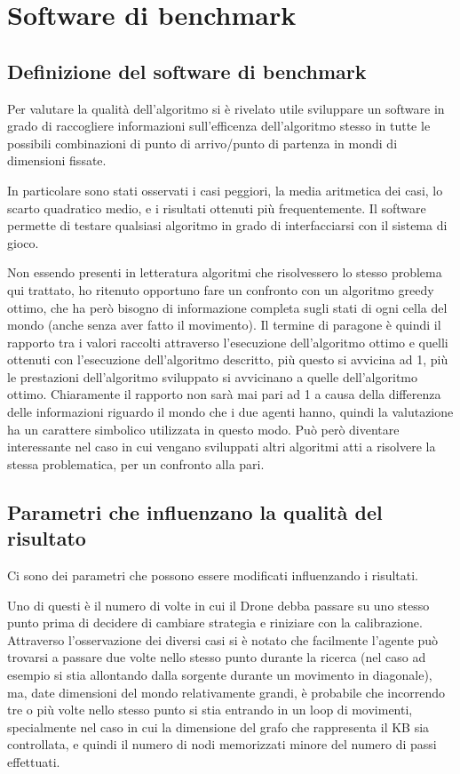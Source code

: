 \chapter{Software di benchmark}
\section{Definizione del software di benchmark}
Per valutare la qualità dell'algoritmo si è rivelato utile sviluppare un software in grado di raccogliere informazioni sull'efficenza dell'algoritmo stesso in tutte le possibili combinazioni di punto di arrivo/punto di partenza in mondi di dimensioni fissate. 

In particolare sono stati osservati i casi peggiori, la media aritmetica dei casi, lo scarto quadratico medio, e i risultati ottenuti più frequentemente. Il software permette di testare qualsiasi algoritmo in grado di interfacciarsi con il sistema di gioco. 

Non essendo presenti in letteratura algoritmi che risolvessero lo stesso problema qui trattato, ho ritenuto opportuno fare un confronto con un algoritmo greedy ottimo, che ha però bisogno di informazione completa sugli stati di ogni cella del mondo (anche senza aver fatto il movimento). Il termine di paragone è quindi il rapporto tra i valori raccolti attraverso l'esecuzione dell'algoritmo ottimo e quelli ottenuti con l'esecuzione dell'algoritmo descritto, più questo si avvicina ad 1, più le prestazioni dell'algoritmo sviluppato si avvicinano a quelle dell'algoritmo ottimo. Chiaramente il rapporto non sarà mai pari ad 1 a causa della differenza delle informazioni riguardo il mondo che i due agenti hanno, quindi la valutazione ha un carattere simbolico utilizzata in questo modo. Può però diventare interessante nel caso in cui vengano sviluppati altri algoritmi atti a risolvere la stessa problematica, per un confronto alla pari.

\section{Parametri che influenzano la qualità del risultato}
Ci sono dei parametri che possono essere modificati influenzando i risultati. 

Uno di questi è il numero di volte in cui il Drone debba passare su uno stesso punto prima di decidere di cambiare strategia e riniziare con la calibrazione. Attraverso l'osservazione dei diversi casi si è notato che facilmente l'agente può trovarsi a passare due volte nello stesso punto durante la ricerca (nel caso ad esempio si stia allontando dalla sorgente durante un movimento in diagonale), ma, date dimensioni del mondo relativamente grandi, è probabile che incorrendo tre o più volte nello stesso punto si stia entrando in un loop di movimenti, specialmente nel caso in cui la dimensione del grafo che rappresenta il KB  sia controllata, e quindi il numero di nodi memorizzati minore del numero di passi effettuati.

